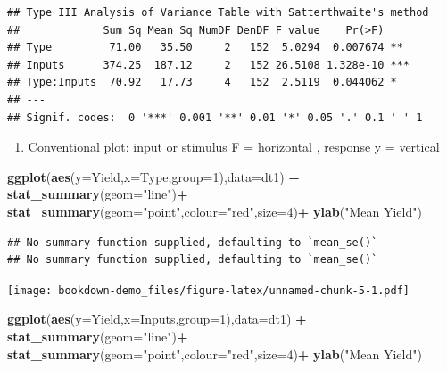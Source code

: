 \documentclass[
]{book}
\newenvironment{Shaded}{\begin{snugshade}}{\end{snugshade}}
\newcommand{\DataTypeTok}[1]{\textcolor[rgb]{0.13,0.29,0.53}{#1}}
\newcommand{\DecValTok}[1]{\textcolor[rgb]{0.00,0.00,0.81}{#1}}
\newcommand{\KeywordTok}[1]{\textcolor[rgb]{0.13,0.29,0.53}{\textbf{#1}}}
\newcommand{\NormalTok}[1]{#1}
\newcommand{\OperatorTok}[1]{\textcolor[rgb]{0.81,0.36,0.00}{\textbf{#1}}}
\newcommand{\StringTok}[1]{\textcolor[rgb]{0.31,0.60,0.02}{#1}}
\providecommand{\tightlist}{%
  \setlength{\itemsep}{0pt}\setlength{\parskip}{0pt}}
\begin{document}
\begin{verbatim}
## Type III Analysis of Variance Table with Satterthwaite's method
##             Sum Sq Mean Sq NumDF DenDF F value    Pr(>F)    
## Type         71.00   35.50     2   152  5.0294  0.007674 ** 
## Inputs      374.25  187.12     2   152 26.5108 1.328e-10 ***
## Type:Inputs  70.92   17.73     4   152  2.5119  0.044062 *  
## ---
## Signif. codes:  0 '***' 0.001 '**' 0.01 '*' 0.05 '.' 0.1 ' ' 1
\end{verbatim}

\begin{enumerate}
\def\labelenumi{\arabic{enumi}.}
\setcounter{enumi}{1}
\tightlist
\item
  Conventional plot: input or stimulus F = horizontal , response y = vertical
\end{enumerate}

\begin{Shaded}
\begin{Highlighting}[]
\KeywordTok{ggplot}\NormalTok{(}\KeywordTok{aes}\NormalTok{(}\DataTypeTok{y=}\NormalTok{Yield,}\DataTypeTok{x=}\NormalTok{Type,}\DataTypeTok{group=}\DecValTok{1}\NormalTok{),}\DataTypeTok{data=}\NormalTok{dt1) }\OperatorTok{+}
\StringTok{  }\KeywordTok{stat_summary}\NormalTok{(}\DataTypeTok{geom=}\StringTok{"line"}\NormalTok{)}\OperatorTok{+}
\StringTok{    }\KeywordTok{stat_summary}\NormalTok{(}\DataTypeTok{geom=}\StringTok{"point"}\NormalTok{,}\DataTypeTok{colour=}\StringTok{"red"}\NormalTok{,}\DataTypeTok{size=}\DecValTok{4}\NormalTok{)}\OperatorTok{+}
\StringTok{      }\KeywordTok{ylab}\NormalTok{(}\StringTok{"Mean Yield"}\NormalTok{)}
\end{Highlighting}
\end{Shaded}

\begin{verbatim}
## No summary function supplied, defaulting to `mean_se()`
## No summary function supplied, defaulting to `mean_se()`
\end{verbatim}

\texttt{[image: bookdown-demo\_files/figure-latex/unnamed-chunk-5-1.pdf]}

\begin{Shaded}
\begin{Highlighting}[]
\KeywordTok{ggplot}\NormalTok{(}\KeywordTok{aes}\NormalTok{(}\DataTypeTok{y=}\NormalTok{Yield,}\DataTypeTok{x=}\NormalTok{Inputs,}\DataTypeTok{group=}\DecValTok{1}\NormalTok{),}\DataTypeTok{data=}\NormalTok{dt1) }\OperatorTok{+}
\StringTok{  }\KeywordTok{stat_summary}\NormalTok{(}\DataTypeTok{geom=}\StringTok{"line"}\NormalTok{)}\OperatorTok{+}
\StringTok{    }\KeywordTok{stat_summary}\NormalTok{(}\DataTypeTok{geom=}\StringTok{"point"}\NormalTok{,}\DataTypeTok{colour=}\StringTok{"red"}\NormalTok{,}\DataTypeTok{size=}\DecValTok{4}\NormalTok{)}\OperatorTok{+}
\StringTok{      }\KeywordTok{ylab}\NormalTok{(}\StringTok{"Mean Yield"}\NormalTok{)}
\end{Highlighting}
\end{Shaded}
\end{document}
